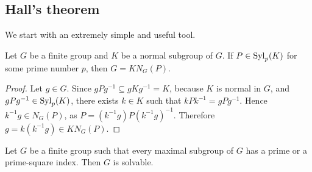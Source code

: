 
\subsection{Hall's theorem}

We start with an extremely simple and useful tool. 

\begin{lemma}
    \label{lem:Frattini_argument}
    Let $G$ be a finite group and $K$ be a normal subgroup of $G$. If 
    $P\in\mathrm{Syl}_p(K)$ for some prime number $p$, then $G=KN_G(P)$.
\end{lemma}

\begin{proof}
	Let $g\in G$. Since $gPg^{-1}\subseteq gKg^{-1}=K$, because $K$ is normal in $G$, 
	and $gPg^{-1}\in\mathrm{Syl}_p(K)$, there exists $k\in K$ such that 
	$kPk^{-1}=gPg^{-1}$. Hence $k^{-1}g\in N_G(P)$, as
	$P=(k^{-1}g)P(k^{-1}g)^{-1}$. Therefore $g=k(k^{-1}g)\in
	KN_G(P)$.
\end{proof}

\begin{theorem}[Hall]
	\label{theorem:Hall}
	Let $G$ be a finite group such that every maximal subgroup of $G$ 
        has a prime or a prime-square index. Then $G$ is solvable. 
\end{theorem}

